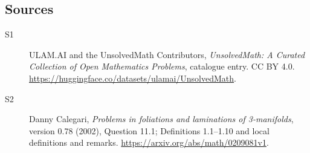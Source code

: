 \documentclass[11pt]{article}
\begin{document}
\subsection{Sources}
\begin{description}
\item[\hypertarget{source:statement:1}{S1}] ULAM.AI and the UnsolvedMath Contributors, \emph{UnsolvedMath: A Curated Collection of Open Mathematics Problems}, catalogue entry. CC BY 4.0. \url{https://huggingface.co/datasets/ulamai/UnsolvedMath}.
\item[\hypertarget{source:statement:2}{S2}] Danny Calegari, \emph{Problems in foliations and laminations of 3-manifolds}, version 0.78 (2002), Question 11.1; Definitions 1.1--1.10 and local definitions and remarks. \url{https://arxiv.org/abs/math/0209081v1}.
\end{description}
\label{end:statement}
\end{document}
